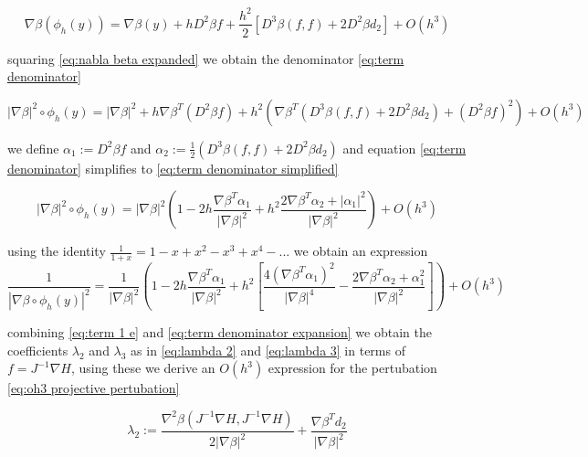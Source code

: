 \documentclass[12pt]{article}
\begin{document}
\begin{equation}\label{eq:nabla beta expanded} 
    \nabla\beta(\phi_h(y)) = \nabla\beta(y) + hD^2\beta f + \frac{h^2}{2}\left[ D^3\beta(f,f) + 2 D^2\beta d_2 \right] + O(h^3) 
\end{equation} 

squaring \eqref{eq:nabla beta expanded} we obtain the denominator \eqref{eq:term denominator}

\begin{equation}\label{eq:term denominator}
    |\nabla\beta|^2 \circ \phi_h(y) = |\nabla\beta|^2 + h \nabla\beta^T \left(D^2\beta f\right) +
    h^2\left(\nabla\beta^T\left( D^3\beta(f,f) + 2 D^2\beta d_2  \right) + \left( D^2\beta f \right)^2\right) + O(h^3)
\end{equation}

we define $\alpha_1 := D^2\beta f$ and $\alpha_2 := \frac{1}{2}\left( D^3\beta(f,f) + 2 D^2\beta d_2 \right)$ and equation \eqref{eq:term denominator} simplifies to \eqref{eq:term denominator simplified}

\begin{equation}\label{eq:term denominator simplified}
    |\nabla\beta|^2 \circ \phi_h(y) = |\nabla\beta|^2 \left( 1 - 2h\frac{\nabla\beta^T\alpha_1}{|\nabla\beta|^2} + h^2\frac{2\nabla\beta^T\alpha_2 + |\alpha_1|^2}{|\nabla\beta|^2} \right) + O(h^3)
\end{equation}

using the identity $\frac{1}{1+x} = 1 - x + x^2 - x^3 + x^4 - ...$ we obtain an expression
\begin{equation}\label{eq:term denominator expansion}
    \frac{1}{|\nabla\beta\circ\phi_h(y)|^2} = \frac{1}{|\nabla\beta|^2}\left(
    1 - 2h\frac{\nabla\beta^T\alpha_1}{|\nabla\beta|^2} + h^2\left[ \frac{4\left( \nabla\beta^T\alpha_1\right)^2}{|\nabla\beta|^4} - \frac{2\nabla\beta^T\alpha_2 + \alpha_1^2}{|\nabla\beta|^2} \right]
    \right) + O(h^3)
\end{equation}

combining \eqref{eq:term 1 e} and \eqref{eq:term denominator expansion} we obtain the coefficients $\lambda_2$ and $\lambda_3$ as in \eqref{eq:lambda 2} and \eqref{eq:lambda 3} in terms of $f = J^{-1}\nabla H$, using these we derive an $O(h^3)$ expression for the pertubation \eqref{eq:oh3 projective pertubation}

\begin{equation}\label{eq:lambda 2}
    \lambda_2 := \frac{ \nabla^2\beta \left( J^{-1} \nabla H , J^{-1} \nabla H\right) }{2|\nabla\beta|^2} + \frac{\nabla\beta^T d_2}{|\nabla\beta|^2}
\end{equation}
\end{document}
